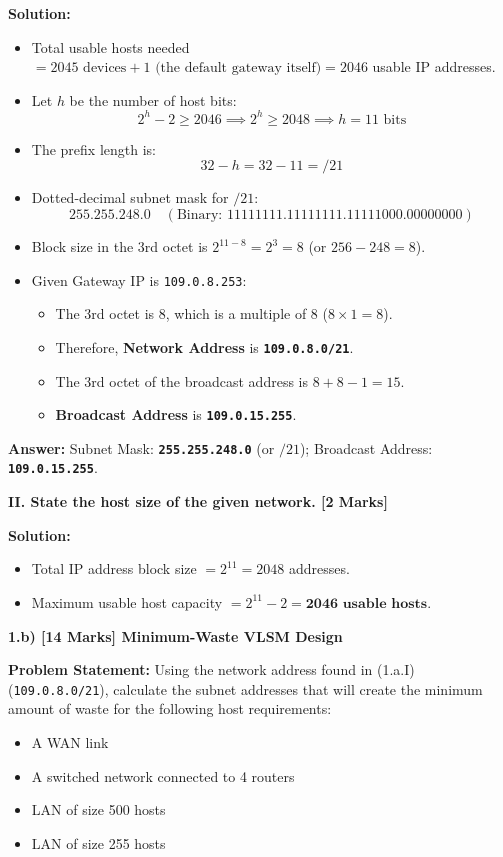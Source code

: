 \documentclass[11pt,a4paper]{article}
\begin{document}
\textbf{Solution:}
\begin{itemize}
    \item Total usable hosts needed $= 2045 \text{ devices} + 1 \text{ (the default gateway itself)} = 2046$ usable IP addresses.
    \item Let $h$ be the number of host bits:
    \[
    2^h - 2 \ge 2046 \implies 2^h \ge 2048 \implies h = 11\text{ bits}
    \]
    \item The prefix length is:
    \[
    32 - h = 32 - 11 = /21
    \]
    \item Dotted-decimal subnet mask for $/21$:
    \[
    \mathbf{255.255.248.0} \quad (\text{Binary: } 11111111.11111111.11111000.00000000)
    \]
    \item Block size in the 3rd octet is $2^{11-8} = 2^3 = 8$ (or $256 - 248 = 8$).
    \item Given Gateway IP is \texttt{109.0.8.253}:
    \begin{itemize}
        \item The 3rd octet is 8, which is a multiple of 8 ($8 \times 1 = 8$).
        \item Therefore, \textbf{Network Address} is \textbf{\texttt{109.0.8.0/21}}.
        \item The 3rd octet of the broadcast address is $8 + 8 - 1 = 15$.
        \item \textbf{Broadcast Address} is \textbf{\texttt{109.0.15.255}}.
    \end{itemize}
\end{itemize}
\textbf{Answer:} Subnet Mask: \textbf{\texttt{255.255.248.0}} (or $/21$); Broadcast Address: \textbf{\texttt{109.0.15.255}}.

\vspace{0.2cm}
\textbf{II. State the host size of the given network. [2 Marks]}

\textbf{Solution:}
\begin{itemize}
    \item Total IP address block size $= 2^{11} = 2048$ addresses.
    \item Maximum usable host capacity $= 2^{11} - 2 = \mathbf{2046\text{ usable hosts}}$.
\end{itemize}

\vspace{0.2cm}
\textbf{1.b) [14 Marks] Minimum-Waste VLSM Design}

\textbf{Problem Statement:}
Using the network address found in (1.a.I) (\texttt{109.0.8.0/21}), calculate the subnet addresses that will create the minimum amount of waste for the following host requirements:
\begin{itemize}
    \item A WAN link
    \item A switched network connected to 4 routers
    \item LAN of size 500 hosts
    \item LAN of size 255 hosts
\end{itemize}
\end{document}
